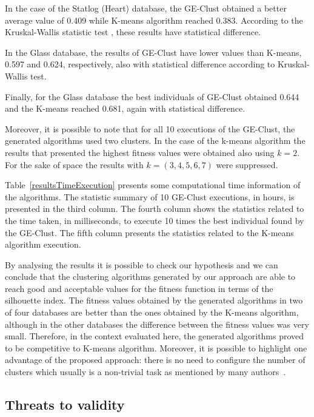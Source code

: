 \documentclass[conference,compsoc]{IEEEtran}
\begin{document}
In the case of the Statlog (Heart) database,  the GE-Clust obtained a better average value of 0.409 while K-means algorithm reached 0.383. According to the  Kruskal-Wallis statistic test \cite{mckight2010kruskal}, these results have statistical difference.

In the Glass database, the results of GE-Clust have lower values than K-means, 0.597 and 0.624, respectively, also with statistical difference according to Kruskal- Wallis test. 

Finally, for the Glass database the best individuals of GE-Clust obtained 0.644 and the K-means reached 0.681, again with statistical difference.

Moreover, it is possible to note that for all 10 executions of the GE-Clust, the generated algorithms used two clusters. In the case of the k-means algorithm the results that presented the highest fitness values were obtained also using $k=2$. For the sake of space the results with $k = (3,4,5,6,7)$ were suppressed.

Table~\ref{resultsTimeExecution} presents some computational time information of the algorithms. The statistic summary of 10 GE-Clust executions, in hours, is presented in the third column. The fourth column shows the statistics related to the time taken, in milliseconds, to execute 10 times the best individual found by the GE-Clust. The fifth column presents the statistics related to the K-means algorithm execution.

By analysing the results it is possible to check our hypothesis and we can conclude that the clustering algorithms generated by our approach are able to reach good and acceptable values for the fitness function in terms of  the silhouette index. The fitness values obtained by the generated algorithms in two of four databases are better than the ones obtained by the K-means algorithm, although in the other databases the difference between the fitness values was very small. Therefore, in the context evaluated here, the generated algorithms proved to be competitive to K-means algorithm. Moreover, it is possible to highlight one advantage of the proposed approach: there is no need to configure the number of clusters which usually is a non-trivial task as mentioned by many authors~\cite{pham2005selection, yan2005methods, tibshirani2001estimating}.


\subsection{Threats to validity}
\end{document}

